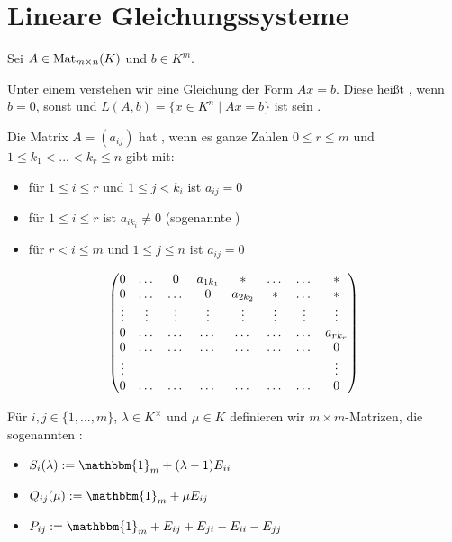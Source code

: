 \section{Lineare Gleichungssysteme}

Sei $A\in \operatorname{Mat}_{m\times n}(K)$ und $b\in K^m$.

\begin{definition}
	Unter einem  verstehen wir eine Gleichung der Form $Ax=b$. 
	Diese heißt , wenn $b=0$, sonst  und $L(A,b)=\{x\in K^n\mid Ax=b\}$ ist sein .
\end{definition}

\begin{definition}[Zeilenstufenform]
	Die Matrix $A=(a_{ij})$ hat , wenn es ganze Zahlen $0\le r \le m$ und $1\le 
	k_1<...<k_r\le n$ gibt mit:
	\begin{itemize}
		\item für $1\le i \le r$ und $1\le j < k_i$ ist $a_{ij}=0$
		\item für $1\le i \le r$ ist $a_{ik_{i}}\neq 0$ (sogenannte )
		\item für $r<i\le m$ und $1\le j\le n$ ist $a_{ij}=0$
	\end{itemize}
	\begin{align}
		\begin{pmatrix}
		0 & \dots & 0 & a_{1k_{1}} & * & \dots & \dots & *\\
		0 & \dots & \dots & 0 & a_{2k_{2}} & * & \dots & *\\
		\vdots & \vdots & \vdots & \vdots & \vdots & \vdots & \vdots & \vdots\\
		0 & \dots & \dots & \dots & \dots & \dots & \dots & a_{rk_{r}}\\
		0 & \dots & \dots & \dots & \dots & \dots & \dots & 0\\
		\vdots & \; & \; & \; & \; & \; & \; & \vdots\\
		0 & \dots & \dots & \dots & \dots & \dots & \dots & 0\\
		\end{pmatrix}\notag
	\end{align}
\end{definition}

\begin{definition}[Elementarmatrizen]
	Für $i,j\in \{1,...,m\}$, $\lambda \in K^{\times}$ und $\mu\in K$ definieren wir 
	$m\times m$-Matrizen, die sogenannten :
	\begin{itemize}
		\item $S_i(\lambda):=\mathbbm{1}_m + (\lambda-1)E_{ii}$
		\item $Q_{ij}(\mu):= \mathbbm{1}_m + \mu E_{ij}$
		\item $P_{ij}:= \mathbbm{1}_m + E_{ij} + E_{ji} - E_{ii} - E_{jj}$
	\end{itemize}
\end{definition}

